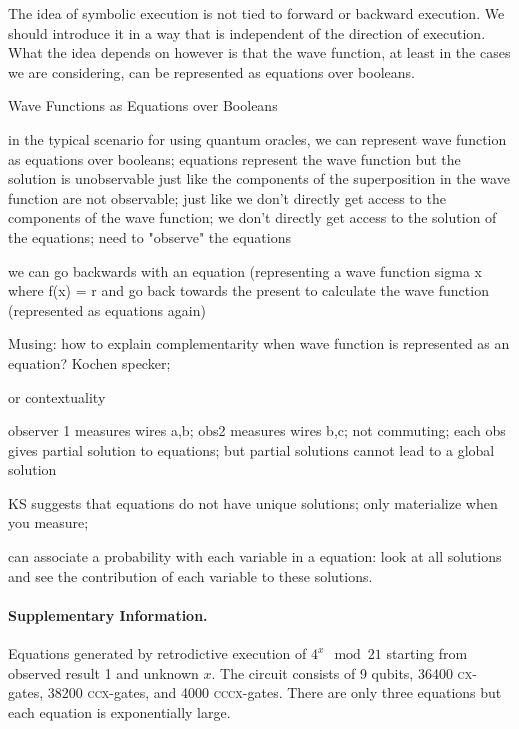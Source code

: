 \documentclass{article}
\newcommand{\cx}{\textsc{cx}}
\newcommand{\ccx}{\textsc{ccx}}
\newcommand{\cccx}{\textsc{cccx}}
\begin{document}
The idea of symbolic execution is not tied to forward or backward
execution. We should introduce it in a way that is independent of the
direction of execution. What the idea depends on however is that the
wave function, at least in the cases we are considering, can be
represented as equations over booleans.

Wave Functions as Equations over Booleans

in the typical scenario for using quantum oracles, we can represent
wave function as equations over booleans; equations represent the wave
function but the solution is unobservable just like the components of
the superposition in the wave function are not observable; just like
we don't directly get access to the components of the wave function;
we don't directly get access to the solution of the equations; need to
"observe" the equations

we can go backwards with an equation (representing a wave function
sigma x where f(x) = r and go back towards the present to calculate
the wave function (represented as equations again)

Musing: how to explain complementarity when wave function is
represented as an equation? Kochen specker;
 
or contextuality
 
observer 1 measures wires a,b; obs2 measures wires b,c; not commuting;
each obs gives partial solution to equations; but partial solutions
cannot lead to a global solution
 
KS suggests that equations do not have unique solutions; only
materialize when you measure;

can associate a probability with each variable in a equation: look at
all solutions and see the contribution of each variable to these
solutions.

\paragraph*{Supplementary Information.} 
\label{par:shor21}

Equations generated by retrodictive execution of $4^x \mod{21}$
starting from observed result 1 and unknown $x$. The circuit consists
of 9 qubits, 36400 \cx-gates, 38200 \ccx-gates, and 4000
\cccx-gates. There are only three equations but each equation is
exponentially large.
\end{document}
